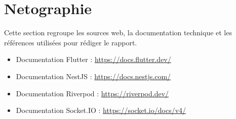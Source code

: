 \chapter*{Netographie}

Cette section regroupe les sources web, la documentation technique et les r\'ef\'erences utilis\'ees pour r\'ediger le rapport.

\begin{itemize}
	\item Documentation Flutter : \url{https://docs.flutter.dev/}
	\item Documentation NestJS : \url{https://docs.nestjs.com/}
	\item Documentation Riverpod : \url{https://riverpod.dev/}
	\item Documentation Socket.IO : \url{https://socket.io/docs/v4/}
\end{itemize}
